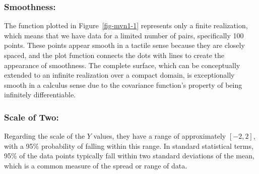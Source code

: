 \documentclass[
  letterpaper,
  DIV=11,
  numbers=noendperiod]{scrreprt}
\begin{document}
\hypertarget{smoothness}{%
\subsubsection{Smoothness:}\label{smoothness}}

The function plotted in Figure~\ref{fig-mvn1-1} represents only a finite
realization, which means that we have data for a limited number of
pairs, specifically 100 points. These points appear smooth in a tactile
sense because they are closely spaced, and the plot function connects
the dots with lines to create the appearance of smoothness. The complete
surface, which can be conceptually extended to an infinite realization
over a compact domain, is exceptionally smooth in a calculus sense due
to the covariance function's property of being infinitely
differentiable.

\hypertarget{scale-of-two}{%
\subsubsection{Scale of Two:}\label{scale-of-two}}

Regarding the scale of the \(Y\) values, they have a range of
approximately \([-2,2]\), with a 95\% probability of falling within this
range. In standard statistical terms, 95\% of the data points typically
fall within two standard deviations of the mean, which is a common
measure of the spread or range of data.
\end{document}
